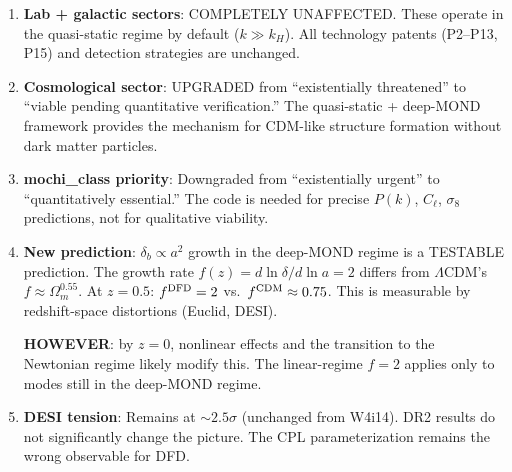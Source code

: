 \documentclass[11pt]{article}
\begin{document}
\begin{enumerate}
\item \textbf{Lab + galactic sectors}: COMPLETELY UNAFFECTED.
  These operate in the quasi-static regime by default ($k \gg k_H$).
  All technology patents (P2--P13, P15) and detection strategies
  are unchanged.

\item \textbf{Cosmological sector}: UPGRADED from ``existentially
  threatened'' to ``viable pending quantitative verification.''
  The quasi-static + deep-MOND framework provides the mechanism for
  CDM-like structure formation without dark matter particles.

\item \textbf{mochi\_class priority}: Downgraded from ``existentially
  urgent'' to ``quantitatively essential.'' The code is needed for
  precise $P(k)$, $C_\ell$, $\sigma_8$ predictions, not for
  qualitative viability.

\item \textbf{New prediction}: $\delta_b \propto a^2$ growth in the
  deep-MOND regime is a TESTABLE prediction. The growth rate
  $f(z) = d\ln\delta/d\ln a = 2$ differs from $\Lambda$CDM's
  $f \approx \Omega_m^{0.55}$. At $z = 0.5$: $f^{\rm DFD} = 2$
  vs.\ $f^{\rm CDM} \approx 0.75$. This is measurable by
  redshift-space distortions (Euclid, DESI).

  \textbf{HOWEVER}: by $z = 0$, nonlinear effects and the transition
  to the Newtonian regime likely modify this. The linear-regime
  $f = 2$ applies only to modes still in the deep-MOND regime.

\item \textbf{DESI tension}: Remains at $\sim 2.5\sigma$ (unchanged
  from W4i14). DR2 results do not significantly change the picture.
  The CPL parameterization remains the wrong observable for DFD.
\end{enumerate}
\end{document}
